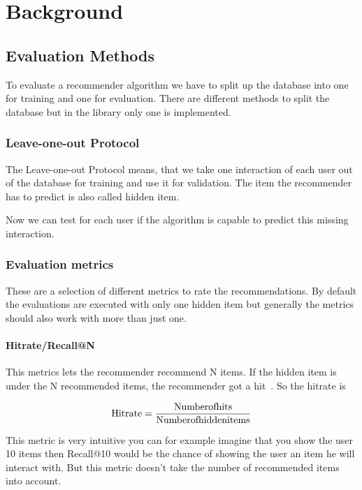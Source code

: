 
\chapter{Background}


\section{Evaluation Methods}

To evaluate a recommender algorithm we have to split up the database
into one for training and one for evaluation. There are different
methods to split the database but in the library only one is implemented.


\subsection{Leave-one-out Protocol}
\label{leaveoneout}

The Leave-one-out Protocol means, that we take one interaction of
each user out of the database for training and use it for validation.
The item the recommender has to predict is also called hidden item. 

Now we can test for each user if the algorithm is capable to predict
this missing interaction.


\subsection{Evaluation metrics}
\label{evaluationmetrics}

These are a selection of different metrics to rate the recommendations.
By default the evaluations are executed with only one hidden item
but generally the metrics should also work with more than just one.


\subsubsection{Hitrate/Recall@N}

This metrics lets the recommender recommend N items. If the hidden
item is under the N recommended items, the recommender got a hit~\cite{Karypis:2001:EIT:502585.502627, Sarwar00applicationof}.
So the hitrate is 

\[
\mathrm{\textrm{Hitrate}}=\frac{\textrm{\ensuremath{\mathrm{Number}}ofhits}}{\textrm{Numberofhiddenitems}}
\]


This metric is very intuitive you can for example imagine that you
show the user 10 items then Recall@10 would be the chance of showing
the user an item he will interact with. But this metric doesn't take
the number of recommended items into account.


